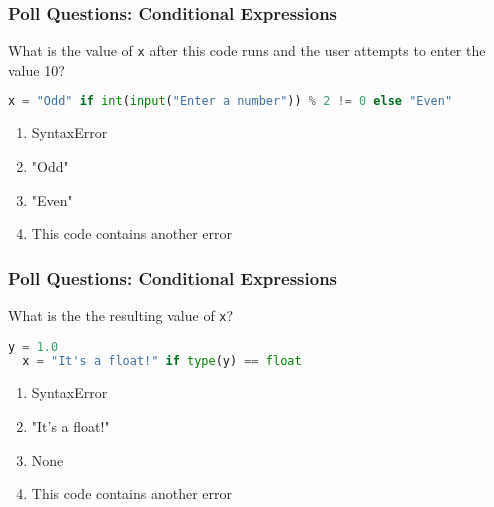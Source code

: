 \documentclass{beamer}
\begin{document}
%
%
\begin{frame}[fragile]
  \frametitle{Poll Questions: Conditional Expressions}
  What is the value of \lstinline|x| after this code runs and the user attempts to enter the value 10?
  \begin{lstlisting}[language=Python, autogobble]
  x = "Odd" if int(input("Enter a number")) % 2 != 0 else "Even"
  \end{lstlisting}
  \vfill
  \begin{enumerate}[A]
    \item SyntaxError
    \item "Odd"
    \item "Even"
    \item This code contains another error
  \end{enumerate}
\end{frame}

%
%
\begin{frame}[fragile]
  \frametitle{Poll Questions: Conditional Expressions}
  What is the the resulting value of \lstinline|x|?
  \begin{lstlisting}[language=Python, autogobble]
  y = 1.0
  x = "It's a float!" if type(y) == float
  \end{lstlisting}
  \vfill
  \begin{enumerate}[A]
    \item SyntaxError
    \item "It's a float!"
    \item None
    \item This code contains another error
  \end{enumerate}
\end{frame}
\end{document}
